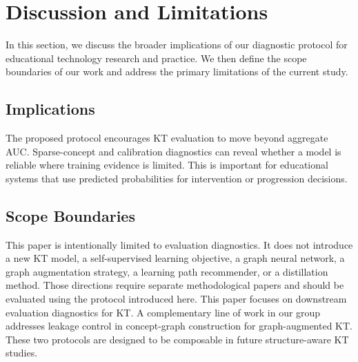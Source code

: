 \section{Discussion and Limitations}
\label{sec:discussion}
In this section, we discuss the broader implications of our diagnostic protocol for educational technology research and practice. We then define the scope boundaries of our work and address the primary limitations of the current study.

\subsection{Implications}
The proposed protocol encourages KT evaluation to move beyond aggregate AUC. Sparse-concept and calibration diagnostics can reveal whether a model is reliable where training evidence is limited. This is important for educational systems that use predicted probabilities for intervention or progression decisions.

\subsection{Scope Boundaries}
This paper is intentionally limited to evaluation diagnostics. It does not introduce a new KT model, a self-supervised learning objective, a graph neural network, a graph augmentation strategy, a learning path recommender, or a distillation method. Those directions require separate methodological papers and should be evaluated using the protocol introduced here. This paper focuses on downstream evaluation diagnostics for KT. A complementary line of work in our group addresses leakage control in concept-graph construction for graph-augmented KT. These two protocols are designed to be composable in future structure-aware KT studies.

